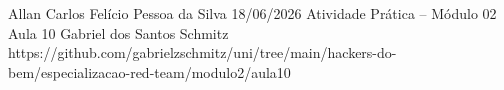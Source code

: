 \documentclass{article}
\begin{document}
{Allan Carlos Felício Pessoa da Silva}
{18/06/2026}
{Atividade Prática -- Módulo 02}
{Aula 10}
{Gabriel dos Santos Schmitz}
{https://github.com/gabrielzschmitz/uni/tree/main/hackers-do-bem/especializacao-red-team/modulo2/aula10}





\newpage
\printbibliography[title=Referências]
\end{document}
